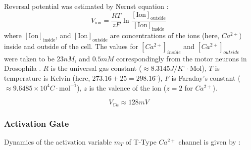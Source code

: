 \documentclass[../../workflow.tex]{subfiles}
\begin{document}
Reversal potential was estimated by Nernst equation \parencite{izhikevichDynamicalSystemsNeuroscience2006}:
\begin{equation*}
    V_{\text{ion}} = \frac{RT}{zF}\ln{\frac{[\text{Ion}]_{\text{outside}}}{[\text{Ion}]_{\text{inside}}}}
\end{equation*}
where $[\text{Ion}]_{\text{inside}}$, and $[\text{Ion}]_{\text{outside}}$ are concentrations of the ions
(here, $Ca^{2+}$) inside and outside of the cell. The values for $[Ca^{2+}]_{inside}$ and 
$[Ca^{2+}]_{outside}$ were taken to be $23 nM$, and $0.5 mM$ correspondingly
from the motor neurons in Drosophila \parencite{macleodFastCalciumSignals2002}.
$R$ is the universal gas constant
($\approx 8.3145 J/K^\circ \cdot \text{Mol}$), $T$ is temperature is Kelvin (here, $273.16+25=298.16^{\circ}$), $F$ is Faraday's constant
($\approx 9.6485 \times 10^{4} C\cdot \text{mol}^{-1}$), $z$ is the valence of the ion ($z=2$ for $Ca^{2+}$).

\begin{equation*}
    V_{Ca} \approx 128 mV
\end{equation*}


\subsubsection{Activation Gate}
Dynamics of the activation variable $m_T$ of T-Type $Ca^{2+}$ channel is given by \parencite{wangModelTtypeCalcium1991}:
\end{document}

